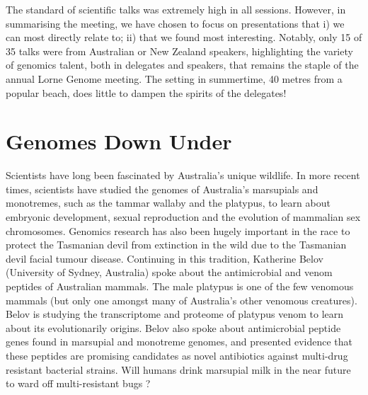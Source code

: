 \documentclass[twocolumn]{bmcart}%
\begin{document}
The standard of scientific talks was extremely high in all sessions.  However, in summarising the meeting, we have chosen to focus on presentations that i) we can most directly relate to; ii) that we found most interesting.  Notably, only 15 of 35 talks were from Australian or New Zealand speakers, highlighting the variety of genomics talent, both in delegates and speakers, that remains the staple of the annual Lorne Genome meeting.  The setting in summertime, 40 metres from a popular beach, does little to dampen the spirits of the delegates!


%

\section*{Genomes Down Under}
Scientists have long been fascinated by Australia's unique wildlife. In more recent times, scientists have studied the genomes of Australia's marsupials and monotremes, such as the tammar wallaby and the platypus, to learn about embryonic development, sexual reproduction and the evolution of mammalian sex chromosomes. Genomics research has also been hugely important in the race to protect the Tasmanian devil from extinction in the wild due to the Tasmanian devil facial tumour disease. Continuing in this tradition, Katherine Belov (University of Sydney, Australia) spoke about the antimicrobial and venom peptides of Australian mammals. The male platypus is one of the few venomous mammals (but only one amongst many of Australia's other venomous creatures). Belov is studying the transcriptome and proteome of platypus venom to learn about its evolutionarily origins. Belov also spoke about antimicrobial peptide genes found in marsupial and monotreme genomes, and presented evidence that these peptides are promising candidates as novel antibiotics against multi-drug resistant bacterial strains.  Will humans drink marsupial milk in the near future to ward off multi-resistant bugs ?
\end{document}

